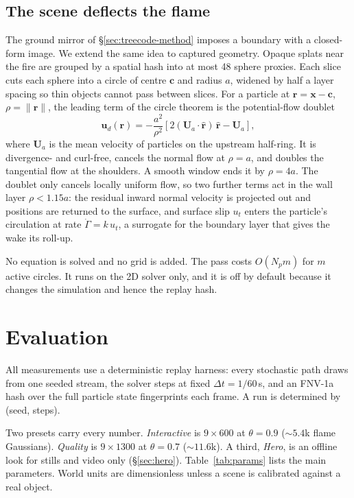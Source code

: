 \documentclass[acmtog,nonacm]{acmart}
\newcommand{\bx}{\mathbf{x}}
\newcommand{\bu}{\mathbf{u}}
\begin{document}
\subsection{The scene deflects the flame}
\label{sec:deflect}
The ground mirror of \S\ref{sec:treecode-method} imposes a boundary with a closed-form image. We extend the same idea to captured geometry. Opaque splats near the fire are grouped by a spatial hash into at most 48 sphere proxies. Each slice cuts each sphere into a circle of centre $\mathbf c$ and radius $a$, widened by half a layer spacing so thin objects cannot pass between slices. For a particle at $\mathbf r=\bx-\mathbf c$, $\rho=\|\mathbf r\|$, the leading term of the circle theorem is the potential-flow doublet
\begin{equation}
\bu_d(\mathbf r)=-\frac{a^2}{\rho^2}\left[2(\mathbf U_a\cdot\hat{\mathbf r})\,\hat{\mathbf r}-\mathbf U_a\right],
\label{eq:doublet}
\end{equation}
where $\mathbf U_a$ is the mean velocity of particles on the upstream half-ring. It is divergence- and curl-free, cancels the normal flow at $\rho=a$, and doubles the tangential flow at the shoulders. A smooth window ends it by $\rho=4a$. The doublet only cancels locally uniform flow, so two further terms act in the wall layer $\rho<1.15a$: the residual inward normal velocity is projected out and positions are returned to the surface, and surface slip $u_t$ enters the particle's circulation at rate $\dot\Gamma=k\,u_t$, a surrogate for the boundary layer that gives the wake its roll-up.

No equation is solved and no grid is added. The pass costs $O(N_pm)$ for $m$ active circles. It runs on the 2D solver only, and it is off by default because it changes the simulation and hence the replay hash.

\section{Evaluation}
\label{sec:eval}
All measurements use a deterministic replay harness: every stochastic path draws from one seeded stream, the solver steps at fixed $\Delta t=1/60$\,s, and an FNV-1a hash over the full particle state fingerprints each frame. A run is determined by (seed, steps).

Two presets carry every number. \emph{Interactive} is $9\times600$ at $\theta=0.9$ ($\sim\!5.4$k flame Gaussians). \emph{Quality} is $9\times1300$ at $\theta=0.7$ ($\sim\!11.6$k). A third, \emph{Hero}, is an offline look for stills and video only (\S\ref{sec:hero}). Table~\ref{tab:params} lists the main parameters. World units are dimensionless unless a scene is calibrated against a real object.
\end{document}
